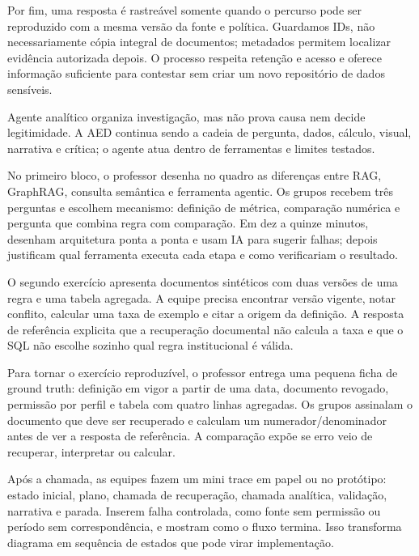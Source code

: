 Por fim, uma resposta é rastreável somente quando o percurso pode ser reproduzido com a mesma versão da fonte e política. Guardamos IDs, não necessariamente cópia integral de documentos; metadados permitem localizar evidência autorizada depois. O processo respeita retenção e acesso e oferece informação suficiente para contestar sem criar um novo repositório de dados sensíveis.

\begin{SummaryBox}
Agente analítico organiza investigação, mas não prova causa nem decide legitimidade. A AED continua sendo a cadeia de pergunta, dados, cálculo, visual, narrativa e crítica; o agente atua dentro de ferramentas e limites testados.
\end{SummaryBox}



No primeiro bloco, o professor desenha no quadro as diferenças entre RAG, GraphRAG, consulta semântica e ferramenta agentic. Os grupos recebem três perguntas e escolhem mecanismo: definição de métrica, comparação numérica e pergunta que combina regra com comparação. Em dez a quinze minutos, desenham arquitetura ponta a ponta e usam IA para sugerir falhas; depois justificam qual ferramenta executa cada etapa e como verificariam o resultado.

O segundo exercício apresenta documentos sintéticos com duas versões de uma regra e uma tabela agregada. A equipe precisa encontrar versão vigente, notar conflito, calcular uma taxa de exemplo e citar a origem da definição. A resposta de referência explicita que a recuperação documental não calcula a taxa e que o SQL não escolhe sozinho qual regra institucional é válida.

Para tornar o exercício reproduzível, o professor entrega uma pequena ficha de ground truth: definição em vigor a partir de uma data, documento revogado, permissão por perfil e tabela com quatro linhas agregadas. Os grupos assinalam o documento que deve ser recuperado e calculam um numerador/denominador antes de ver a resposta de referência. A comparação expõe se erro veio de recuperar, interpretar ou calcular.

Após a chamada, as equipes fazem um mini trace em papel ou no protótipo: estado inicial, plano, chamada de recuperação, chamada analítica, validação, narrativa e parada. Inserem falha controlada, como fonte sem permissão ou período sem correspondência, e mostram como o fluxo termina. Isso transforma diagrama em sequência de estados que pode virar implementação.

